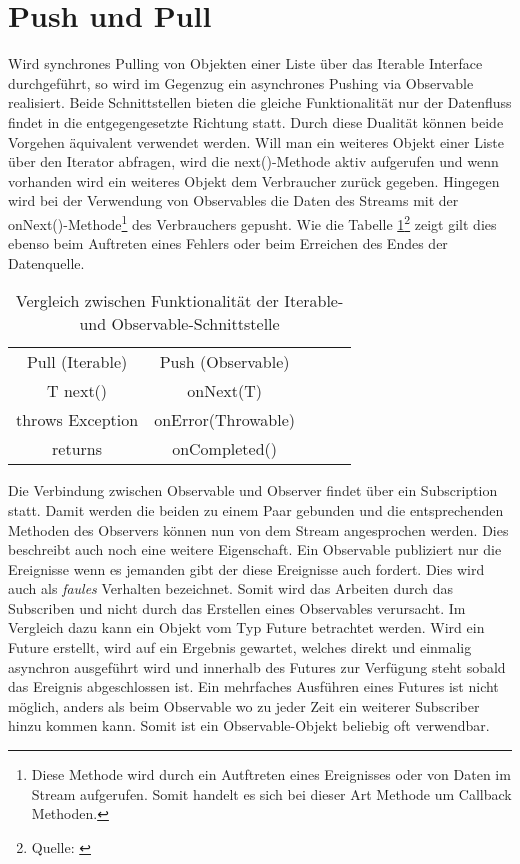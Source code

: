 \section{Push und Pull}
Wird synchrones Pulling von Objekten einer Liste über das Iterable Interface durchgeführt, so wird im Gegenzug ein asynchrones Pushing via Observable realisiert. Beide Schnittstellen bieten die gleiche Funktionalität nur der Datenfluss findet in die entgegengesetzte Richtung statt. Durch diese Dualität können beide Vorgehen äquivalent verwendet werden. Will man ein weiteres Objekt einer Liste über den Iterator abfragen, wird die next()-Methode aktiv aufgerufen und wenn vorhanden wird ein weiteres Objekt dem Verbraucher zurück gegeben. Hingegen wird bei der Verwendung von Observables die Daten des Streams mit der onNext()-Methode\footnote{Diese Methode wird durch ein Autftreten eines Ereignisses oder von Daten im Stream aufgerufen. Somit handelt es sich bei dieser Art Methode um Callback Methoden.} des Verbrauchers gepusht. Wie die Tabelle \ref{tbl.vglIterObs}\footnote{Quelle: \cite{reactivex.io}} zeigt gilt dies ebenso beim Auftreten eines Fehlers oder beim Erreichen des Endes der Datenquelle.
\begin{table}[]
	\centering
	\begin{tabular}{|c|c|lll}
		\cline{1-2}
		\cellcolor[HTML]{C0C0C0}Pull (Iterable) & \cellcolor[HTML]{C0C0C0}Push (Observable) &  &  &  \\ \cline{1-2}
		T next()                                & onNext(T)                                 &  &  &  \\ \cline{1-2}
		throws Exception                        & onError(Throwable)                        &  &  &  \\ \cline{1-2}
		returns                                 & onCompleted()                             &  &  &  \\ \cline{1-2}
	\end{tabular}
	\caption{Vergleich zwischen Funktionalität der Iterable- und Observable-Schnittstelle}
	\label{tbl.vglIterObs}
\end{table}
Die Verbindung zwischen Observable und Observer findet über ein Subscription statt. Damit werden die beiden zu einem Paar gebunden und die entsprechenden Methoden des Observers können nun von dem Stream angesprochen werden. Dies beschreibt auch noch eine weitere Eigenschaft. Ein Observable publiziert nur die Ereignisse wenn es jemanden gibt der diese Ereignisse auch fordert. Dies wird auch als \textit{faules} Verhalten bezeichnet. Somit wird das Arbeiten durch das Subscriben und nicht durch das Erstellen eines Observables verursacht. Im Vergleich dazu kann ein Objekt vom Typ Future betrachtet werden. Wird ein Future erstellt, wird auf ein Ergebnis gewartet, welches direkt und einmalig asynchron ausgeführt wird und innerhalb des Futures zur Verfügung steht sobald das Ereignis abgeschlossen ist. Ein mehrfaches Ausführen eines Futures ist nicht möglich, anders als beim Observable wo zu jeder Zeit ein weiterer Subscriber hinzu kommen kann. Somit ist ein Observable-Objekt beliebig oft verwendbar. 
